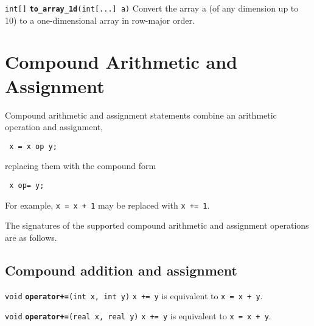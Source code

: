 \documentclass[
  10pt,
]{book}
\begin{document}

\texttt{int{[}{]}} \textbf{\texttt{to\_array\_1d}}\texttt{(int{[}...{]}\ a)}\newline
Convert the array a (of any dimension up to 10) to a one-dimensional
array in row-major order.

\hypertarget{compound-arithmetic-and-assignment}{%
\chapter{Compound Arithmetic and Assignment}\label{compound-arithmetic-and-assignment}}

Compound arithmetic and assignment statements combine an arithmetic
operation and assignment,

\begin{verbatim}
 x = x op y;
\end{verbatim}

replacing them with the compound form

\begin{verbatim}
 x op= y;
\end{verbatim}

For example, \texttt{x\ =\ x\ +\ 1} may be replaced with \texttt{x\ +=\ 1}.

The signatures of the supported compound arithmetic and assignment
operations are as follows.

\hypertarget{compound-addition-and-assignment}{%
\section{Compound addition and assignment}\label{compound-addition-and-assignment}}


\texttt{void} \textbf{\texttt{operator+=}}\texttt{(int\ x,\ int\ y)}\newline
\texttt{x\ +=\ y} is equivalent to \texttt{x\ =\ x\ +\ y}.


\texttt{void} \textbf{\texttt{operator+=}}\texttt{(real\ x,\ real\ y)}\newline
\texttt{x\ +=\ y} is equivalent to \texttt{x\ =\ x\ +\ y}.

\end{document}
